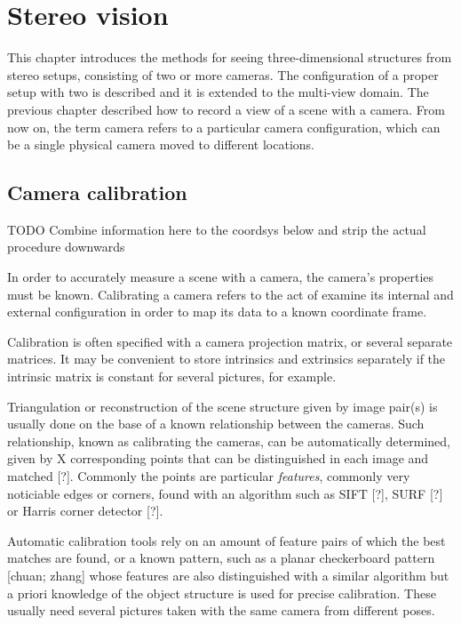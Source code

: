 \section{Stereo vision}

This chapter introduces the methods for seeing three-dimensional structures from stereo setups, consisting of two or more cameras.
The configuration of a proper setup with two is described and it is extended to the multi-view domain.
The previous chapter described how to record a view of a scene with a camera. From now on, the term camera refers to a particular camera configuration, which can be a single physical camera moved to different locations.

\subsection{Camera calibration}

TODO Combine information here to the coordsys below and strip the actual procedure downwards

In order to accurately measure a scene with a camera, the camera's properties must be known. Calibrating a camera refers to the act of examine its internal and external configuration in order to map its data to a known coordinate frame.

Calibration is often specified with a camera projection matrix, or several separate matrices.
It may be convenient to store intrinsics and extrinsics separately if the intrinsic matrix is constant for several pictures, for example.

Triangulation or reconstruction of the scene structure given by image pair(s) is usually done on the base of a known relationship between the cameras.
Such relationship, known as calibrating the cameras, can be automatically determined, given by X corresponding points that can be distinguished in each image and matched [?].
Commonly the points are particular \emph{features}, commonly very noticiable edges or corners, found with an algorithm such as SIFT [?], SURF [?] or Harris corner detector [?].

Automatic calibration tools rely on an amount of feature pairs of which the best matches are found, or a known pattern, such as a planar checkerboard pattern [chuan; zhang] whose features are also distinguished with a similar algorithm but a priori knowledge of the object structure is used for precise calibration.
These usually need several pictures taken with the same camera from different poses.


